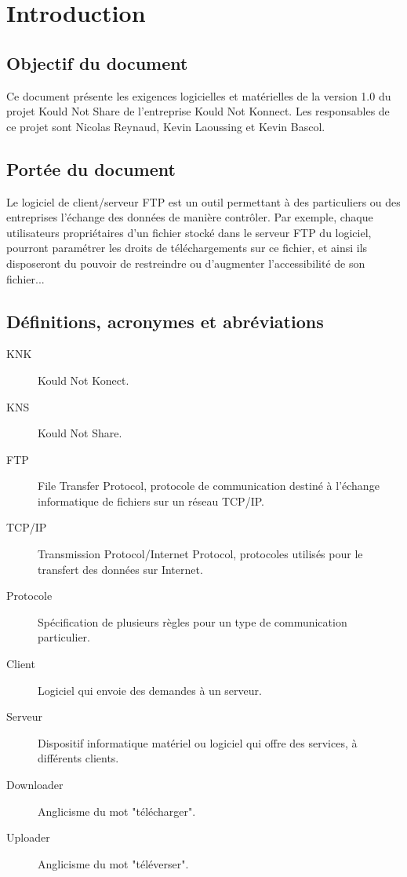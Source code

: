 \documentclass[10pt,a4paper]{report}
\begin{document}

\section{Introduction}

\subsection{Objectif du document}
Ce document présente les exigences logicielles et matérielles de la version 1.0 du projet Kould Not Share de l'entreprise Kould Not Konnect. Les responsables de ce projet sont Nicolas Reynaud, Kevin Laoussing et Kevin Bascol.

\subsection{Portée du document}
Le logiciel de client/serveur FTP est un outil permettant à des particuliers ou des entreprises l'échange des données de manière contrôler. Par exemple, chaque utilisateurs propriétaires d'un fichier stocké dans le serveur FTP du logiciel, pourront paramétrer les droits de téléchargements sur ce fichier, et ainsi ils disposeront du pouvoir de restreindre ou d'augmenter l'accessibilité de son fichier...


\subsection{Définitions, acronymes et abréviations}
\begin{description}
\item[KNK] Kould Not Konect.
\item[KNS] Kould Not Share.
\item[FTP] File Transfer Protocol, protocole de communication destiné à l'échange informatique de fichiers sur un réseau TCP/IP.
\item[TCP/IP] Transmission Protocol/Internet Protocol, protocoles utilisés pour le transfert des données sur Internet.
\item[Protocole] Spécification de plusieurs règles pour un type de communication particulier.
\item[Client] Logiciel qui envoie des demandes à un serveur.
\item[Serveur] Dispositif informatique matériel ou logiciel qui offre des services, à différents clients.
\item[Downloader] Anglicisme du mot "télécharger".
\item[Uploader] Anglicisme du mot "téléverser".
\end{description}
\end{document}
